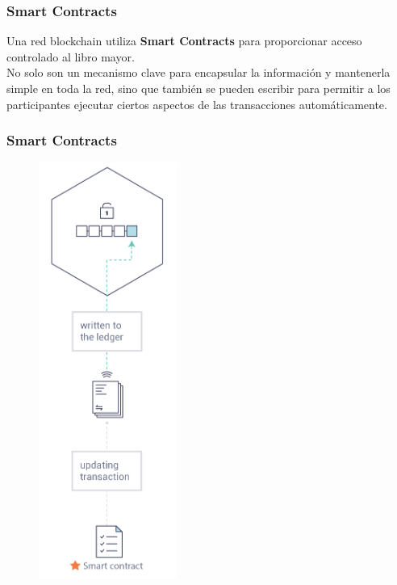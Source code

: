 \documentclass{beamer}
\begin{document}
	\begin{frame}
		\frametitle{Smart Contracts}
		Una red blockchain utiliza \textbf{Smart Contracts} para proporcionar acceso controlado al libro mayor.\\
		\vspace{4mm}
		No solo son un mecanismo clave para encapsular la información y mantenerla simple en toda la red, sino que también se pueden escribir para permitir a los participantes ejecutar ciertos aspectos de las transacciones automáticamente.
	\end{frame}

	\begin{frame}
		\frametitle{Smart Contracts}
		\begin{figure}[h]
			\includegraphics[scale=.55]{smartcontract_figure}
			\centering
		\end{figure}
	\end{frame}
\end{document}
